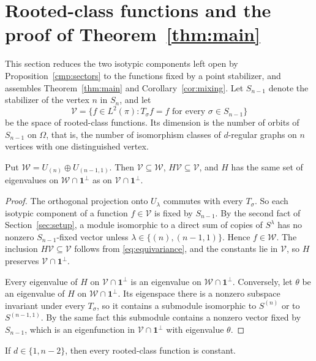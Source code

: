 \section{Rooted-class functions and the proof of Theorem~\ref{thm:main}}\label{root:section}
This section reduces the two isotypic components left open by
Proposition~\ref{cmp:sectors} to the functions fixed by a point stabilizer,
and assembles Theorem~\ref{thm:main} and Corollary~\ref{cor:mixing}. Let
$S_{n-1}$ denote the stabilizer of the vertex $n$ in $S_n$, and let
\[
 \mathcal V=\{f\in L^2(\pi):T_\sigma f=f\text{ for every }\sigma\in S_{n-1}\}
\]
be the space of rooted-class functions. Its dimension is the number of orbits
of $S_{n-1}$ on $\Omega$, that is, the number of isomorphism classes of
$d$-regular graphs on $n$ vertices with one distinguished vertex.

\begin{proposition}\label{root:reduction}
Put $\mathcal W=U_{(n)}\oplus U_{(n-1,1)}$. Then $\mathcal V\subseteq\mathcal W$,
$H\mathcal V\subseteq\mathcal V$, and $H$ has the same set of eigenvalues on
$\mathcal W\cap\mathbf1^\perp$ as on $\mathcal V\cap\mathbf1^\perp$.
\end{proposition}

\begin{proof}
The orthogonal projection onto $U_\lambda$ commutes with every $T_\sigma$. So
each isotypic component of a function $f\in\mathcal V$ is fixed by $S_{n-1}$.
By the second fact of Section~\ref{sec:setup}, a module isomorphic to a direct
sum of copies of $S^\lambda$ has no nonzero $S_{n-1}$-fixed vector unless
$\lambda\in\{(n),(n-1,1)\}$. Hence $f\in\mathcal W$. The inclusion
$H\mathcal V\subseteq\mathcal V$ follows from \eqref{eq:equivariance}, and the
constants lie in $\mathcal V$, so $H$ preserves
$\mathcal V\cap\mathbf1^\perp$.

Every eigenvalue of $H$ on $\mathcal V\cap\mathbf1^\perp$ is an eigenvalue on
$\mathcal W\cap\mathbf1^\perp$. Conversely, let $\theta$ be an eigenvalue of
$H$ on $\mathcal W\cap\mathbf1^\perp$. Its eigenspace there is a nonzero
subspace invariant under every $T_\sigma$, so it contains a submodule
isomorphic to $S^{(n)}$ or to $S^{(n-1,1)}$. By the same fact this submodule
contains a nonzero vector fixed by $S_{n-1}$, which is an eigenfunction in
$\mathcal V\cap\mathbf1^\perp$ with eigenvalue $\theta$.
\end{proof}

\begin{lemma}\label{root:single}
If $d\in\{1,n-2\}$, then every rooted-class function is constant.
\end{lemma}

